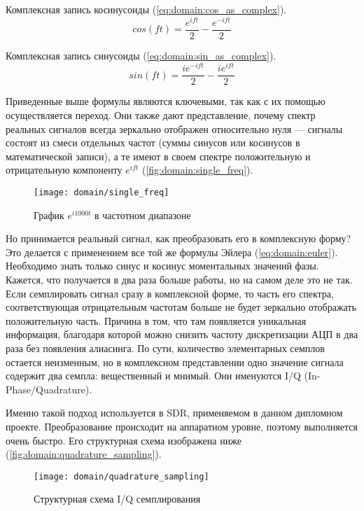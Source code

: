 \bigskip
Комплексная запись косинусоиды (\autoref{eq:domain:cos_as_complex}).
\begin{equation}
  \label{eq:domain:cos_as_complex}
  cos(ft) = \frac{e^{ift}}{2} - \frac{e^{-ift}}{2}
\end{equation}

Комплексная запись синусоиды (\autoref{eq:domain:sin_as_complex}).
\begin{equation}
  \label{eq:domain:sin_as_complex}
  sin(ft) = \frac{ie^{-ift}}{2} - \frac{ie^{ift}}{2}
\end{equation}

Приведенные выше формулы являются ключевыми, так как с их помощью осуществляется переход. Они также дают представление, почему спектр реальных сигналов всегда зеркально отображен относительно нуля --- сигналы состоят из смеси отдельных частот (суммы синусов или косинусов в математической записи), а те имеют в своем спектре положительную и отрицательную компоненту $e^{ift}$ (\autoref{fig:domain:single_freq}).

\begin{figure}[h]
  \centering
  \texttt{[image: domain/single\_freq]}
  \caption{График $e^{i1000t}$ в частотном диапазоне}
  \label{fig:domain:single_freq}
\end{figure}

Но принимается реальный сигнал, как преобразовать его в комплексную форму? Это делается с применением все той же формулы Эйлера (\ref{eq:domain:euler}). Необходимо знать только синус и косинус моментальных значений фазы. Кажется, что получается в два раза больше работы, но на самом деле это не так. Если семплировать сигнал сразу в комплексной форме, то часть его спектра, соответствующая отрицательным частотам больше не будет зеркально отображать положительную часть. Причина в том, что там появляется уникальная информация, благодаря которой можно снизить частоту дискретизации АЦП в два раза без появления алиасинга. По сути, количество элементарных семплов остается неизменным, но в комплексном представлении одно значение сигнала содержит два семпла: вещественный и мнимый. Они именуются I/Q (In-Phase/Quadrature).

Именно такой подход используется в SDR, применяемом в данном дипломном проекте. Преобразование происходит на аппаратном уровне, поэтому выполняется очень быстро. Его структурная схема изображена ниже (\autoref{fig:domain:quadrature_sampling}).

\begin{figure}[h]
  \centering
  \texttt{[image: domain/quadrature\_sampling]}
  \caption{Структурная схема I/Q семплирования \cite{quadrature_signals}}
  \label{fig:domain:quadrature_sampling}
\end{figure}
